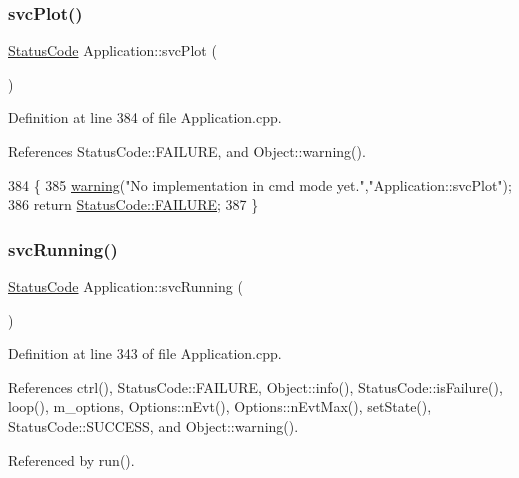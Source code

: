 \subsubsection{\texorpdfstring{svc\+Plot()}{svcPlot()}}
{\footnotesize\ttfamily \hyperlink{classStatusCode}{Status\+Code} Application\+::svc\+Plot (\begin{DoxyParamCaption}{ }\end{DoxyParamCaption})}



Definition at line 384 of file Application.\+cpp.



References Status\+Code\+::\+F\+A\+I\+L\+U\+RE, and Object\+::warning().


\begin{DoxyCode}
384                                   \{
385   \hyperlink{classObject_a65cd4fda577711660821fd2cd5a3b4c9}{warning}(\textcolor{stringliteral}{"No implementation in cmd mode yet."},\textcolor{stringliteral}{"Application::svcPlot"});
386   \textcolor{keywordflow}{return} \hyperlink{classStatusCode_a6f565cbeadc76d14c72f047e5e85eb4ba3da73d4c469762eb9d3c960368252b26}{StatusCode::FAILURE};
387 \}
\end{DoxyCode}
\mbox{\label{classApplication_a35eca6b5e618b508a0736d032e2a9203}} 
\subsubsection{\texorpdfstring{svc\+Running()}{svcRunning()}}
{\footnotesize\ttfamily \hyperlink{classStatusCode}{Status\+Code} Application\+::svc\+Running (\begin{DoxyParamCaption}{ }\end{DoxyParamCaption})}



Definition at line 343 of file Application.\+cpp.



References ctrl(), Status\+Code\+::\+F\+A\+I\+L\+U\+RE, Object\+::info(), Status\+Code\+::is\+Failure(), loop(), m\+\_\+options, Options\+::n\+Evt(), Options\+::n\+Evt\+Max(), set\+State(), Status\+Code\+::\+S\+U\+C\+C\+E\+SS, and Object\+::warning().



Referenced by run().


